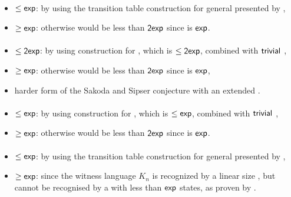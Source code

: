 \paragraph{\OMOLA{}\tto\ONFA}\label{cost:OM1LAto1NFA}
\begin{itemize}
	\item $\le\mathsf{exp}$: by using the transition table construction for general \OLAs presented by ,
	\item $\ge\mathsf{exp}$: otherwise \hyperref[cost:OM1LAto1DFA]{\OMOLA{}\tto\ODFA} would be less than $\mathsf{2exp}$ since\linebreak\hyperref[cost:1NFAto1DFA]{\ONFA{}\tto\ODFA} is $\mathsf{exp}$.
\end{itemize}
\paragraph{\OMOLA{}\tto\TDFA}
\begin{itemize}
	\item $\le\mathsf{2exp}$: by using construction for \hyperref[cost:OM1LAto1DFA]{\OMOLA{}\tto\ODFA}, which is $\le\mathsf{2exp}$, combined with $\mathsf{trivial}$ \ODFA{}\tto\TDFA,
	\item $\ge\mathsf{exp}$: otherwise \hyperref[cost:OM1LAto1DFA]{\OMOLA{}\tto\ODFA} would be less than $\mathsf{2exp}$ since\linebreak\hyperref[cost:2DFAto1DFA]{\TDFA{}\tto\ODFA} is $\mathsf{exp}$,
	\item harder form of the Sakoda and Sipser conjecture with an extended \TNFA.
\end{itemize}
\paragraph{\OMOLA{}\tto\TNFA}
\begin{itemize}
	\item $\le\mathsf{exp}$: by using construction for \hyperref[cost:OM1LAto1NFA]{\OMOLA{}\tto\ONFA}, which is $\le\mathsf{exp}$, combined with $\mathsf{trivial}$ \ONFA{}\tto\TNFA,
	\item $\ge\mathsf{exp}$: otherwise \hyperref[cost:OM1LAto1DFA]{\OMOLA{}\tto\ODFA} would be less than $\mathsf{2exp}$ since\linebreak\hyperref[cost:2NFAto1DFA]{\TNFA{}\tto\ODFA} is $\mathsf{exp}$.
\end{itemize}
\paragraph{\OMODLA{}\tto\ODFA}\label{cost:OM1DLAto1DFA}
\begin{itemize}
	\item $\le\mathsf{exp}$: by using the transition table construction for general \ODLAs presented by ,
	\item $\ge\mathsf{exp}$: since the witness language $K_n$ is recognized by a linear size \OMODLA, but cannot be recognised by a \TNFA with less than $\mathsf{exp}$ states, as proven by .
\end{itemize}
